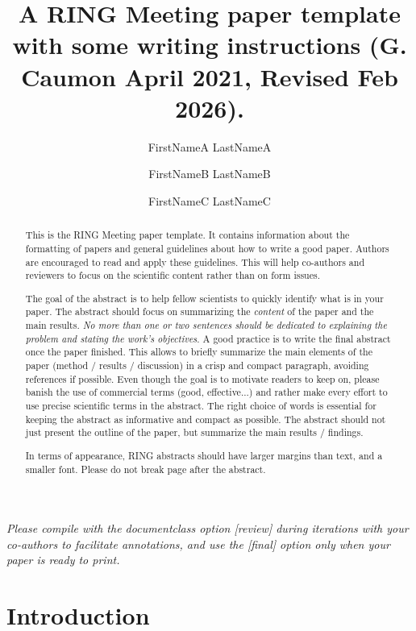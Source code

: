 \documentclass[preprint]{ring}
\title{A RING Meeting paper template with some writing instructions \newline (G. Caumon April 2021, Revised Feb 2026).}
\author[1]{FirstNameA LastNameA}
\author[2]{FirstNameB LastNameB}
\author[1,2]{FirstNameC LastNameC}
\affil[1]{Université de Lorraine, CNRS, GeoRessources, F-54000 Nancy}
\affil[2]{Organization, department, Zip code, Country}
\begin{document}
\maketitle

\begin{abstract}

This is the RING Meeting paper template. It contains information about the formatting of papers and general guidelines about how to write a good paper. Authors are encouraged to read and apply these guidelines. This will help co-authors and reviewers to focus on the scientific content rather than on form issues. 

The goal of the abstract is to help fellow scientists to quickly identify what is in your paper. The abstract should focus on summarizing the \emph{content} of the paper and the main results. \emph{No more than one or two sentences should be dedicated to explaining the problem and stating the work’s objectives}. A good practice is to write the final abstract once the paper finished. This allows to briefly summarize the main elements of the paper (method / results / discussion) in a crisp and compact paragraph, avoiding references if possible. Even though the goal is to motivate readers to keep on, please banish the use of commercial terms (good, effective...) and rather make every effort to use precise scientific terms in the abstract. The right choice of words is essential for keeping the abstract as informative and compact as possible. The abstract should not just present the outline of the paper, but summarize the main results / findings. 

In terms of appearance, RING abstracts should have larger margins than text, and a smaller font. Please do not break page after the abstract.

\end{abstract}

\emph{Please compile with the documentclass option [review] during iterations with your co-authors to facilitate annotations, and use the [final] option only when your paper is ready to print.}


\section*{Introduction}
\end{document}
